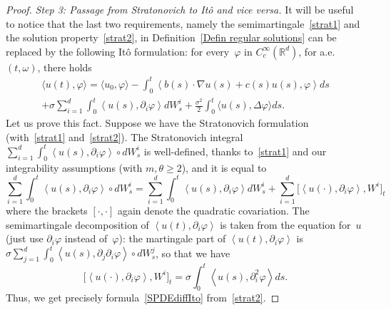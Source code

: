 \documentclass[a4paper,10pt]{article}
\newcommand\1{\mathbbm{1}}
\newcommand{\lan}{\langle}
\newcommand{\ran}{\rangle}
\numberwithin{equation}{section}
\begin{document}
\begin{proof}
\emph{Step 3: Passage from Stratonovich to It\^o and vice versa.} It will be useful to notice that the last two requirements, namely the semimartingale~\ref{strat1} and the solution property~\ref{strat2}, in Definition~\ref{Defin regular solutions} can be replaced by the following It\^o formulation: for every~$\varphi$ in $C_{c}^{\infty}(\mathbb{R}^{d})$, for a.e.~$(t,\omega)$, there holds
\begin{multline}
\langle u(t),\varphi\rangle=\langle u_{0},\varphi\rangle -\int_{0}^{t}\left\langle b(s) \cdot\nabla u(s) + c(s) u(s),\varphi\right\rangle ds \\
  +\sigma \sum_{i=1}^{d}\int_{0}^{t}\left\langle u(s),\partial_{i} \varphi\right\rangle dW_{s}^{i} +\frac{\sigma^2}{2} \int_{0}^{t} \lan u(s),\Delta\varphi\ran ds .\label{SPDEdiffIto}
\end{multline}
Let us prove this fact. Suppose we have the Stratonovich formulation (with~\ref{strat1} and~\ref{strat2}). The Stratono\-vich integral $\sum_{i=1}^{d}\int_{0}^{t}\left\langle u(  s)  ,\partial_{i}\varphi\right\rangle \circ dW_{s}^{i}$ is well-defined, thanks to~\ref{strat1} and our integrability assumptions (with $m,\theta\ge2$), and it is equal to
\begin{equation*}
\sum_{i=1}^{d}\int_{0}^{t}\left\langle u(s) ,\partial_{i}\varphi\right\rangle \circ dW_{s}^{i}=\sum_{i=1}^{d}\int_{0}^{t}\left\langle u(  s)  ,\partial_{i}\varphi \right\rangle dW_{s}^{i}+\sum_{i=1}^{d}\big[  \left\langle u(\cdot),\partial_{i}\varphi\right\rangle ,W^{i}\big]_{t} 
\end{equation*}
where the brackets $[\cdot,\cdot]$ again denote the quadratic covariation. The semimartingale decomposition of $\left\langle u(t),\partial_{i}\varphi\right\rangle $ is taken from the equation for~$u$ (just use $\partial_i\varphi$ instead of~$\varphi$): the martingale part of $\left\langle u(t),\partial_{i}\varphi\right\rangle $ is $\sigma\sum_{j=1}^{d}\int_{0}^{t}\left\langle u(s),\partial_{j}\partial_{i}\varphi\right\rangle \circ dW_{s}^{j}$, so that we have
\begin{equation}
\label{ito-strato-corrector}
\big[\left\langle u(\cdot),\partial_{i} \varphi\right\rangle ,W^{i} \big]_{t} = \sigma\int_{0}^{t} \left\langle
u(  s) ,\partial_{i}^{2}\varphi\right\rangle ds .
\end{equation}
Thus, we get precisely formula~\eqref{SPDEdiffIto} from~\ref{strat2}.


\end{proof}
\end{document}
